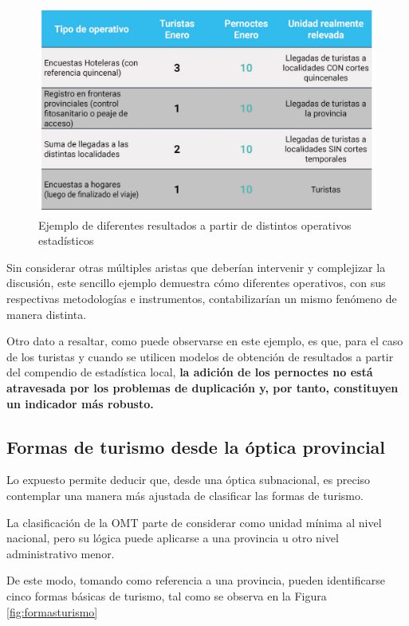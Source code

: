 \documentclass[
]{book}
\begin{document}
\begin{figure}

{\centering \includegraphics[width=0.8\linewidth]{imagenes/figura1.5} 

}

\caption{Ejemplo de diferentes resultados a partir de distintos operativos estadísticos}\label{fig:operativos}
\end{figure}

Sin considerar otras múltiples aristas que deberían intervenir y complejizar la discusión, este sencillo ejemplo demuestra cómo diferentes operativos, con sus respectivas metodologías e instrumentos, contabilizarían un mismo fenómeno de manera distinta.

Otro dato a resaltar, como puede observarse en este ejemplo, es que, para el caso de los turistas y cuando se utilicen modelos de obtención de resultados a partir del compendio de estadística local, \textbf{la adición de los pernoctes no está atravesada por los problemas de duplicación y, por tanto, constituyen un indicador más robusto.}

\hypertarget{formas-de-turismo-desde-la-uxf3ptica-provincial}{%
\subsection{Formas de turismo desde la óptica provincial}\label{formas-de-turismo-desde-la-uxf3ptica-provincial}}

Lo expuesto permite deducir que, desde una óptica subnacional, es preciso contemplar una manera más ajustada de clasificar las formas de turismo.

La clasificación de la OMT parte de considerar como unidad mínima al nivel nacional, pero su lógica puede aplicarse a una provincia u otro nivel administrativo menor.

De este modo, tomando como referencia a una provincia, pueden identificarse cinco formas básicas de turismo, tal como se observa en la Figura \ref{fig:formasturismo}
\end{document}
